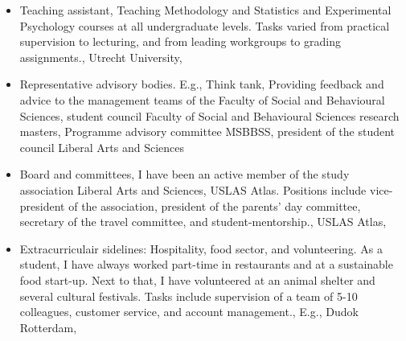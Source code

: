 \documentclass[
  letterpaper,
  DIV=11,
  numbers=noendperiod,
  oneside]{scrartcl}
\providecommand{\tightlist}{%
  \setlength{\itemsep}{0pt}\setlength{\parskip}{0pt}}\usepackage{longtable,booktabs,array}
\begin{document}
\begin{itemize}
\tightlist
\item
  Teaching assistant, Teaching Methodology and Statistics and
  Experimental Psychology courses at all undergraduate levels. Tasks
  varied from practical supervision to lecturing, and from leading
  workgroups to grading assignments., Utrecht University,
\end{itemize}

{}

\begin{itemize}
\tightlist
\item
  Representative advisory bodies. E.g., Think tank, Providing feedback
  and advice to the management teams of the Faculty of Social and
  Behavioural Sciences, student council Faculty of Social and
  Behavioural Sciences research masters, Programme advisory committee
  MSBBSS, president of the student council Liberal Arts and Sciences
\end{itemize}

{}

\begin{itemize}
\tightlist
\item
  Board and committees, I have been an active member of the study
  association Liberal Arts and Sciences, USLAS Atlas. Positions include
  vice-president of the association, president of the parents' day
  committee, secretary of the travel committee, and student-mentorship.,
  USLAS Atlas,
\end{itemize}

{}

\begin{itemize}
\tightlist
\item
  Extracurriculair sidelines: Hospitality, food sector, and
  volunteering. As a student, I have always worked part-time in
  restaurants and at a sustainable food start-up. Next to that, I have
  volunteered at an animal shelter and several cultural festivals. Tasks
  include supervision of a team of 5-10 colleagues, customer service,
  and account management., E.g., Dudok Rotterdam,
\end{itemize}
\end{document}
